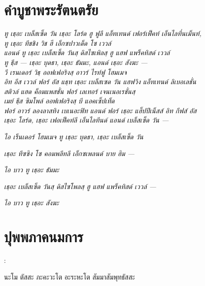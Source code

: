 \chapter{คําบูชาพระรัตนตรัย}
\textit{ทู เธฺอะ เบล็สเซ็ด วัน เธฺอะ โลร์ด ฮู ฟูลี แอ็ทเทนด์ เฟอร์เฟ็คท์
เอ็นไลทึ่นเม็นท์,}\\
\textit{ทู เธฺอะ ทีชชิง วิช ฮี เอ็กซปาวเด็ด โซ เววล์}\\
\textit{แอนด์ ทู เธฺอะ เบล็สเซ็ด วันสฺ ดิสไซเพิลสฺ ฮู แฮฟ แพร็คทิสด์ เววล์}\\
\textit{ทู ธีฺส — เธฺอะ บุดธา, เธฺอะ ธัมมะ, แอนด์ เธฺอะ สังฆะ —}\\
\textit{วี เรนเดอร์ วิธฺ ออฟเฟอริงสฺ อาวร์ ไรท์ฟู โฮมเมจ}\\
\textit{อิท อีส เววล์ ฟอร์ อัส แธฺท เธฺอะ เบล็สเซด วัน แฮฟวิง แอ็ทเทนด์ ลิเบอเลชั่น}\\
\textit{สติวล์ แฮด ค็อมแพสชั่น ฟอร์ เลเทอร์ เจนเนอเรชั่นสฺ}\\
\textit{เมย์ ธีฺส ซิมโพล์ ออฟเฟอริงสฺ บี แอคเซ็ปเท็ด}\\
\textit{ฟอร์ อาวร์ ลองลาสทิง เบเนอะฟิท แอนด์ ฟอร์ เธฺอะ แฮ็ปปีเน็สส์ อิท กีฟส์ อัส}\\
\textit{เธฺอะ โลร์ด, เธฺอะ เฟอเฟ็คท์ลี เอ็นไลทึนด์ แอนด์ เบล็สเซ็ด วัน —}\\

\begin{english}
	\textit{ไอ เร็นเดอร์ โฮมเมจ ทู เธฺอะ บุดธา, เธฺอะ เบล็สเซ็ด วัน} 
\end{english}

\textit{เธฺอะ ทีซซิง โซ คอมพลีทลี เอ็กซเพลนด์ บาย ฮิม —}

\begin{english}
\textit{ไอ บาว ทู เธฺอะ ธัมมะ} 
\end{english}

\textit{เธฺอะ เบล็สเซ็ด วันสฺ ดิสไซโพลสฺ ฮู แฮฟ แพร็คทิสด์ เววล์ —}

\begin{english}
	\textit{ไอ บาว ทู เธฺอะ สังฆะ} 
\end{english}

\chapter{ปุพพภาคนมการ}:
\begin{leader}
\end{leader}

นะโม ตัสสะ ภะคะวะโต อะระหะโต สัมมาสัมพุทธัสสะ 

